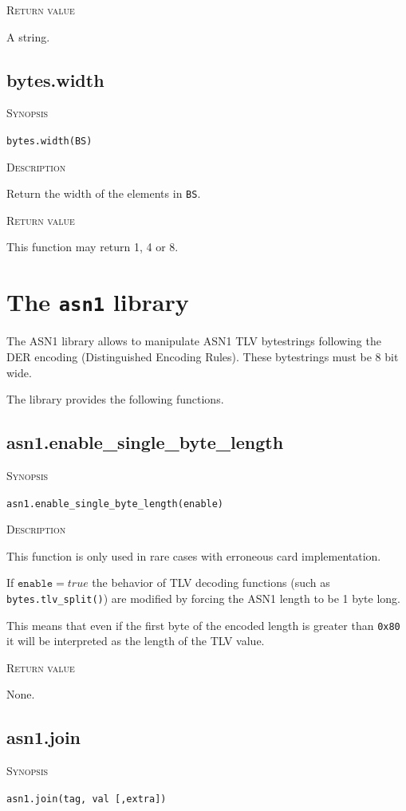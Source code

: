 \documentclass[11pt]{report}
\newcommand{\mansection}[1]{\vspace{0.5em}\par\noindent\textsc{#1}\vspace{0.5em}\par}
\newcommand{\syn}[1]{\texttt{#1}}
\begin{document}
\mansection{Return value}
  A string.


\subsection{bytes.width}

\mansection{Synopsis}
\syn{bytes.width(BS)}

\mansection{Description}
  Return the width of the elements in \syn{BS}.

\mansection{Return value}
  This function may return 1, 4 or 8.


\section{The \syn{asn1} library}

The ASN1 library allows to manipulate ASN1 TLV bytestrings following the DER 
encoding (Distinguished Encoding Rules).
These bytestrings must be 8 bit wide.

The library provides the following functions.


\subsection{asn1.enable\_single\_byte\_length}

\mansection{Synopsis}
\syn{asn1.enable\_single\_byte\_length(enable)}

\mansection{Description}
  This function is only used in rare cases with erroneous card implementation.
  
  If $\syn{enable}=true$ the behavior of TLV decoding functions 
  (such as \syn{bytes.tlv\_split()}) are modified by forcing the ASN1 
  length to be 1 byte long. 
  
  This means that even if the first byte of the encoded length is greater 
  than \syn{0x80} it will be interpreted as the length of the TLV value.

\mansection{Return value}
  None.

\subsection{asn1.join}

\mansection{Synopsis}
\syn{asn1.join(tag, val [,extra])}
\end{document}
